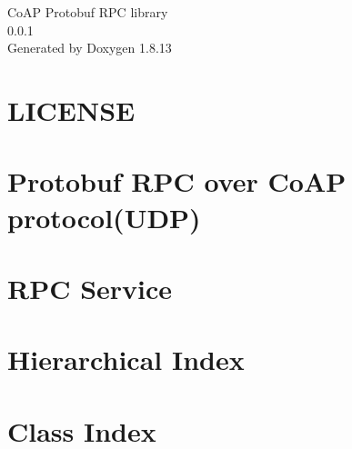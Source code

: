 \documentclass[twoside]{book}
\newcommand{\+}{\discretionary{\mbox{\scriptsize$\hookleftarrow$}}{}{}}
\newcommand{\clearemptydoublepage}{%
  \newpage{\pagestyle{empty}\cleardoublepage}%
}
\begin{document}
\hypersetup{pageanchor=false,
             bookmarksnumbered=true,
             pdfencoding=unicode
            }
\begin{titlepage}
\vspace*{7cm}
\begin{center}%
{\Large Co\+AP Protobuf R\+PC library \\[1ex]\large 0.\+0.\+1 }\\
\vspace*{1cm}
{\large Generated by Doxygen 1.8.13}\\
\end{center}
\end{titlepage}
\clearemptydoublepage
{}
\tableofcontents
\clearemptydoublepage
{}
\hypersetup{pageanchor=true}

\chapter{L\+I\+C\+E\+N\+SE}
\label{md_LICENSE}

\chapter{Protobuf R\+PC over Co\+AP protocol(U\+DP)}
\label{md_README}

\chapter{R\+PC Service}
\label{ServiceManager_8h}

\chapter{Hierarchical Index}

\chapter{Class Index}

\end{document}
